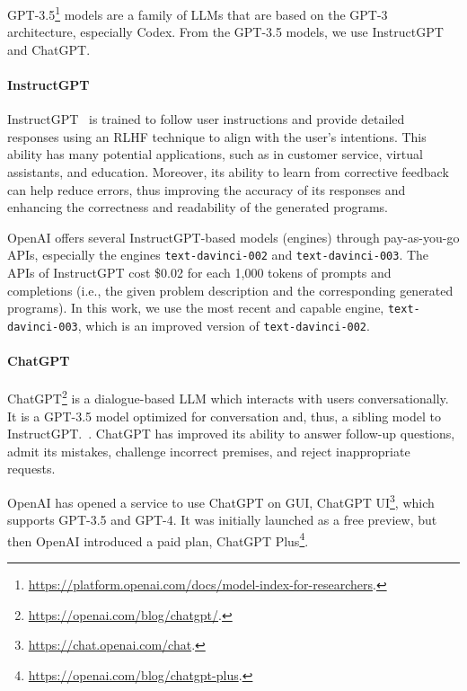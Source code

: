 \documentclass{article}
\begin{document}
GPT-3.5\footnote{\url{https://platform.openai.com/docs/model-index-for-researchers}.} models are a family of LLMs that are based on the GPT-3 architecture, especially Codex.
From the GPT-3.5 models, we use InstructGPT and ChatGPT.





\paragraph{InstructGPT}

InstructGPT~\citep{ouyang2022instructgpt} is trained to follow user instructions and provide detailed responses using an RLHF technique to align with the user's intentions.
This ability has many potential applications, such as in customer service, virtual assistants, and education.
Moreover, its ability to learn from corrective feedback can help reduce errors, thus improving the accuracy of its responses and enhancing the correctness and readability of the generated programs.

OpenAI offers several InstructGPT-based models (engines) through pay-as-you-go APIs, especially the engines \texttt{text-davinci-002} and \texttt{text-davinci-003}.
The APIs of InstructGPT cost \$0.02 for each 1,000 tokens of prompts and completions (i.e., the given problem description and the corresponding generated programs).
In this work, we use the most recent and capable engine, \texttt{text-davinci-003}, which is an improved version of \texttt{text-davinci-002}.





\paragraph{ChatGPT}

ChatGPT\footnote{\url{https://openai.com/blog/chatgpt/}.} is a dialogue-based LLM which interacts with users conversationally.
It is a GPT-3.5 model optimized for conversation and, thus, a sibling model to InstructGPT.~\citep{ouyang2022instructgpt}.
ChatGPT has improved its ability to answer follow-up questions, admit its mistakes, challenge incorrect premises, and reject inappropriate requests.

OpenAI has opened a service to use ChatGPT on GUI, ChatGPT UI\footnote{\url{https://chat.openai.com/chat}.}, which supports GPT-3.5 and GPT-4.
It was initially launched as a free preview, but then OpenAI introduced a paid plan, ChatGPT Plus\footnote{\url{https://openai.com/blog/chatgpt-plus}.}.
\end{document}

